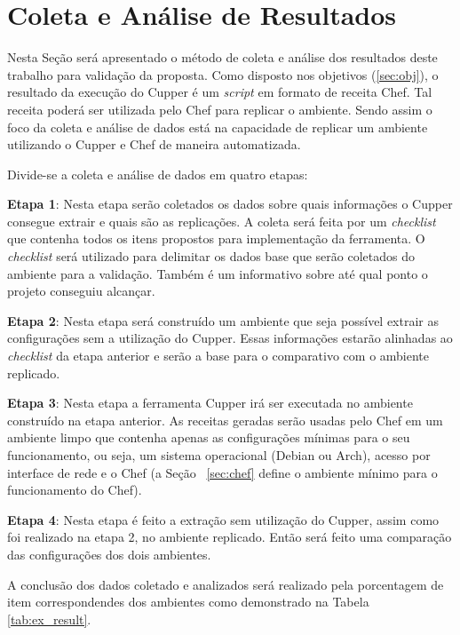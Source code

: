 \section{Coleta e Análise de Resultados}

Nesta Seção será apresentado o método de coleta e análise dos resultados deste %
trabalho para validação da proposta. Como disposto nos objetivos (\ref{sec:obj}),
o resultado da execução do Cupper é um \textit{script} em formato de receita Chef.
Tal receita poderá ser utilizada pelo Chef para replicar o ambiente. Sendo assim
o foco da coleta e análise de dados está na capacidade de replicar um ambiente
utilizando o Cupper e Chef de maneira automatizada.

Divide-se a coleta e análise de dados em quatro etapas:

\textbf{Etapa 1}: Nesta etapa serão coletados os dados sobre quais informações o Cupper consegue
extrair e quais são as replicações. A coleta será feita por um \textit{checklist} que contenha
todos os itens propostos para implementação da ferramenta. O \textit{checklist} será
utilizado para delimitar os dados base que serão coletados do ambiente para
a validação. Também é um informativo sobre até qual ponto o projeto conseguiu
alcançar.

\textbf{Etapa 2}: Nesta etapa será construído um ambiente que seja possível extrair as configurações
sem a utilização do Cupper. Essas informações estarão alinhadas ao \textit{checklist} da etapa
anterior e serão a base para o comparativo com o ambiente replicado.

\textbf{Etapa 3}: Nesta etapa a ferramenta Cupper irá ser executada no ambiente construído na etapa
anterior. As receitas geradas serão usadas pelo Chef em um ambiente limpo que contenha
apenas as configurações mínimas para o seu funcionamento, ou seja, um sistema
operacional (Debian ou Arch), acesso por interface de rede e o Chef (a Seção
~\ref{sec:chef} define o ambiente mínimo para o funcionamento do Chef).

\textbf{Etapa 4}: Nesta etapa é feito a extração sem utilização do Cupper, assim como foi realizado
na etapa 2, no ambiente replicado. Então será feito uma comparação das configurações
dos dois ambientes.

A conclusão dos dados coletado e analizados será realizado pela porcentagem de
item correspondendes dos ambientes como demonstrado na Tabela \ref{tab:ex_result}.

